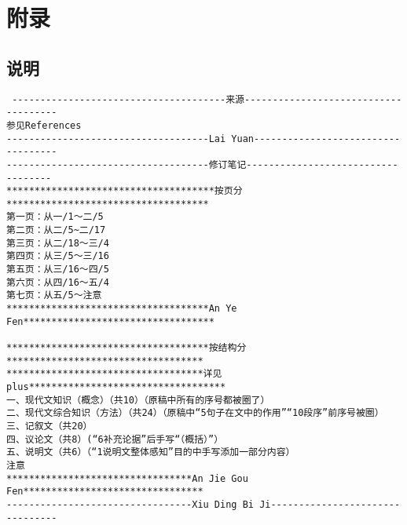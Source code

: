 \newpage
\appendix
{}
\section{附录}
\subsection{说明}
\begin{verbatim} --------------------------------------来源-------------------------------------
参见References
------------------------------------Lai Yuan-----------------------------------
------------------------------------修订笔记-----------------------------------
*************************************按页分************************************
第一页：从一/1～二/5
第二页：从二/5~二/17
第三页：从二/18～三/4
第四页：从三/5～三/16
第五页：从三/16～四/5
第六页：从四/16～五/4
第七页：从五/5～注意
************************************An Ye Fen**********************************

************************************按结构分***********************************
***********************************详见plus***********************************
一、现代文知识（概念）（共10）（原稿中所有的序号都被圈了）
二、现代文综合知识（方法）（共24）（原稿中“5句子在文中的作用”“10段序”前序号被圈）
三、记叙文（共20）
四、议论文（共8）(“6补充论据”后手写“（概括）”）
五、说明文（共6）（“1说明文整体感知”目的中手写添加一部分内容）
注意
*********************************An Jie Gou Fen********************************
---------------------------------Xiu Ding Bi Ji--------------------------------


\end{verbatim}
